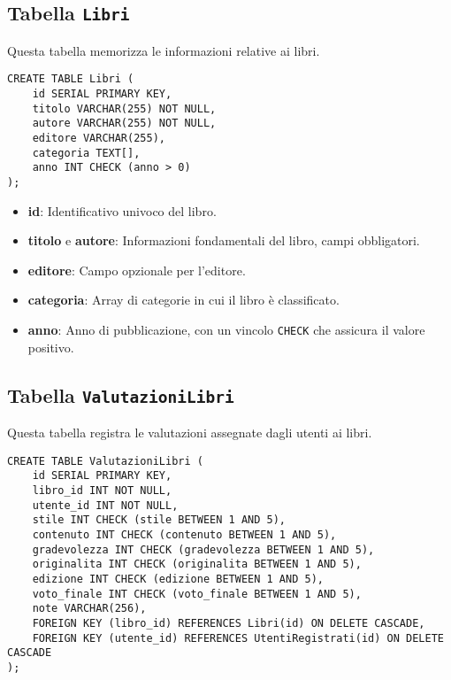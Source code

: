 \documentclass{report}
\begin{document}
\subsection{Tabella \texttt{Libri}}
Questa tabella memorizza le informazioni relative ai libri.

\begin{lstlisting}
CREATE TABLE Libri (
    id SERIAL PRIMARY KEY,
    titolo VARCHAR(255) NOT NULL,
    autore VARCHAR(255) NOT NULL,
    editore VARCHAR(255),
    categoria TEXT[],
    anno INT CHECK (anno > 0)
);
\end{lstlisting}

\begin{itemize}
    \item \textbf{id}: Identificativo univoco del libro.
    \item \textbf{titolo} e \textbf{autore}: Informazioni fondamentali del libro, campi obbligatori.
    \item \textbf{editore}: Campo opzionale per l'editore.
    \item \textbf{categoria}: Array di categorie in cui il libro è classificato.
    \item \textbf{anno}: Anno di pubblicazione, con un vincolo \texttt{CHECK} che assicura il valore positivo.
\end{itemize}

\subsection{Tabella \texttt{ValutazioniLibri}}
Questa tabella registra le valutazioni assegnate dagli utenti ai libri.

\begin{lstlisting}
CREATE TABLE ValutazioniLibri (
    id SERIAL PRIMARY KEY,
    libro_id INT NOT NULL,
    utente_id INT NOT NULL,
    stile INT CHECK (stile BETWEEN 1 AND 5),
    contenuto INT CHECK (contenuto BETWEEN 1 AND 5),
    gradevolezza INT CHECK (gradevolezza BETWEEN 1 AND 5),
    originalita INT CHECK (originalita BETWEEN 1 AND 5),
    edizione INT CHECK (edizione BETWEEN 1 AND 5),
    voto_finale INT CHECK (voto_finale BETWEEN 1 AND 5),
    note VARCHAR(256),
    FOREIGN KEY (libro_id) REFERENCES Libri(id) ON DELETE CASCADE,
    FOREIGN KEY (utente_id) REFERENCES UtentiRegistrati(id) ON DELETE CASCADE
);
\end{lstlisting}
\end{document}
